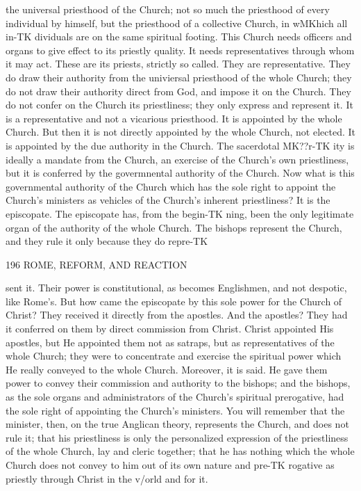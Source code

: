 \documentclass[12pt,a5paper,twoside]{book}
\begin{document}
{the universal priesthood of the Church; not so much 
the priesthood of every individual by himself, but the 
priesthood of a collective Church, in wMKhich all in-TK
dividuals are on the same spiritual footing. This 
Church needs officers and organs to give effect to its 
priestly quality. It needs representatives through 
whom it may act. These are its priests, strictly so 
called. They are representative. They do draw 
their authority from the univiersal priesthood of the 
whole Church; they do not draw their authority 
direct from God, and impose it on the Church. They 
do not confer on the Church its priestliness; they 
only express and represent it. It is a representative 
and not a vicarious priesthood. It is appointed by the 
whole Church. But then it is not directly appointed 
by the whole Church, not elected. It is appointed by 
the due authority in the Church. The sacerdotal MK??r-TK
ity is ideally a mandate from the Church, an exercise 
of the Church's own priestliness, but it is conferred by 
the govermnental authority of the Church. Now what 
is this governmental authority of the Church which 
has the sole right to appoint the Church's ministers as 
vehicles of the Church's inherent priestliness? It is 
the episcopate. The episcopate has, from the begin-TK
ning, been the only legitimate organ of the authority 
of the whole Church. The bishops represent the 
Church, and they rule it only because they do repre-TK



196 ROME, REFORM, AND REACTION 

sent it. Their power is constitutional, as becomes 
Englishmen, and not despotic, like Rome's. But how 
came the episcopate by this sole power for the Church 
of Christ? They received it directly from the apostles. 
And the apostles? They had it conferred on them 
by direct commission from Christ. Christ appointed 
His apostles, but He appointed them not as satraps, 
but as representatives of the whole Church; they 
were to concentrate and exercise the spiritual power 
which He really conveyed to the whole Church. 
Moreover, it is said. He gave them power to convey 
their commission and authority to the bishops; and 
the bishops, as the sole organs and administrators of 
the Church's spiritual prerogative, had the sole right 
of appointing the Church's ministers. You will 
remember that the minister, then, on the true Anglican 
theory, represents the Church, and does not rule it; 
that his priestliness is only the personalized expression 
of the priestliness of the whole Church, lay and cleric 
together; that he has nothing which the whole Church 
does not convey to him out of its own nature and pre-TK
rogative as priestly through Christ in the v/orld and 
for it. 

}
\end{document}

